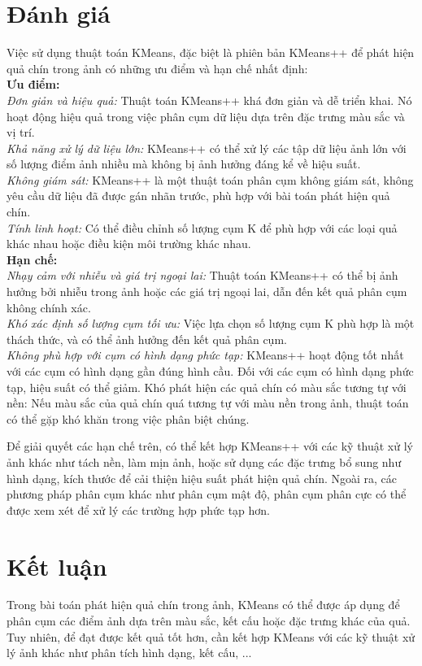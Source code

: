 \documentclass[a4paper]{article}
\begin{document}
\section{Đánh giá}
Việc sử dụng thuật toán KMeans, đặc biệt là phiên bản KMeans++ để phát hiện quả chín trong ảnh có những ưu điểm và hạn chế nhất định: \\
\textbf{Ưu điểm:} \\
\textit{Đơn giản và hiệu quả:} Thuật toán KMeans++ khá đơn giản và dễ triển khai. Nó hoạt động hiệu quả trong việc phân cụm dữ liệu dựa trên đặc trưng màu sắc và vị trí. \\
\textit{Khả năng xử lý dữ liệu lớn:} KMeans++ có thể xử lý các tập dữ liệu ảnh lớn với số lượng điểm ảnh nhiều mà không bị ảnh hưởng đáng kể về hiệu suất. \\
\textit{Không giám sát: }KMeans++ là một thuật toán phân cụm không giám sát, không yêu cầu dữ liệu đã được gán nhãn trước, phù hợp với bài toán phát hiện quả chín.\\ 
\textit{Tính linh hoạt:} Có thể điều chỉnh số lượng cụm K để phù hợp với các loại quả khác nhau hoặc điều kiện môi trường khác nhau. \\
\textbf{Hạn chế:} \\
\textit{Nhạy cảm với nhiễu và giá trị ngoại lai:} Thuật toán KMeans++ có thể bị ảnh hưởng bởi nhiễu trong ảnh hoặc các giá trị ngoại lai, dẫn đến kết quả phân cụm không chính xác. \\
\textit{Khó xác định số lượng cụm tối ưu:} Việc lựa chọn số lượng cụm K phù hợp là một thách thức, và có thể ảnh hưởng đến kết quả phân cụm. \\
\textit{Không phù hợp với cụm có hình dạng phức tạp:} KMeans++ hoạt động tốt nhất với các cụm có hình dạng gần đúng hình cầu. Đối với các cụm có hình dạng phức tạp, hiệu suất có thể giảm.
Khó phát hiện các quả chín có màu sắc tương tự với nền: Nếu màu sắc của quả chín quá tương tự với màu nền trong ảnh, thuật toán có thể gặp khó khăn trong việc phân biệt chúng. 

Để giải quyết các hạn chế trên, có thể kết hợp KMeans++ với các kỹ thuật xử lý ảnh khác như tách nền, làm mịn ảnh, hoặc sử dụng các đặc trưng bổ sung như hình dạng, kích thước để cải thiện hiệu suất phát hiện quả chín. Ngoài ra, các phương pháp phân cụm khác như phân cụm mật độ, phân cụm phân cực có thể được xem xét để xử lý các trường hợp phức tạp hơn.

\section{Kết luận}
Trong bài toán phát hiện quả chín trong ảnh, KMeans có thể được áp dụng để
phân cụm các điểm ảnh dựa trên màu sắc, kết cấu hoặc đặc trưng khác của quả. Tuy
nhiên, để đạt được kết quả tốt hơn, cần kết hợp KMeans với các kỹ thuật xử lý ảnh
khác như phân tích hình dạng, kết cấu, ...
\end{document}
